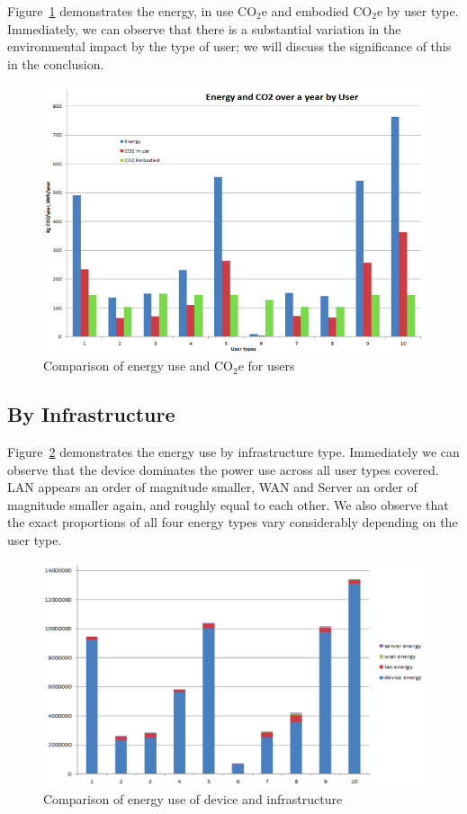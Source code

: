 \documentclass[conference]{IEEEtran}
\begin{document}
Figure~\ref{fig:energyuse_co2e_overyearbyuser} demonstrates the
energy, in use CO$_2$e and embodied CO$_2$e by user type.  Immediately, we
can observe that there is a substantial variation in the environmental
impact by the type of user; we will discuss the significance of this
in the conclusion.

\begin{figure}[!htp]
\centering
\includegraphics[width=0.9\columnwidth]{images/energyuse_co2e_overyearbyuser.png}
\caption{Comparison of energy use and CO$_2$e for users}
\label{fig:energyuse_co2e_overyearbyuser} 
\end{figure}

\subsection{By Infrastructure}

Figure~\ref{fig:energyusecomparison} demonstrates the energy use by
infrastructure type. Immediately we can observe that the device
dominates the power use across all user types covered. LAN appears an
order of magnitude smaller, WAN and Server an order of magnitude
smaller again, and roughly equal to each other. We also observe that
the exact proportions of all four energy types vary considerably
depending on the user type.

\begin{figure}[!htp]
\centering
\includegraphics[width=0.9\columnwidth]{images/energyuse_comparison.png}
\caption{Comparison of energy use of device and infrastructure}
\label{fig:energyusecomparison} 
\end{figure}
\end{document}
